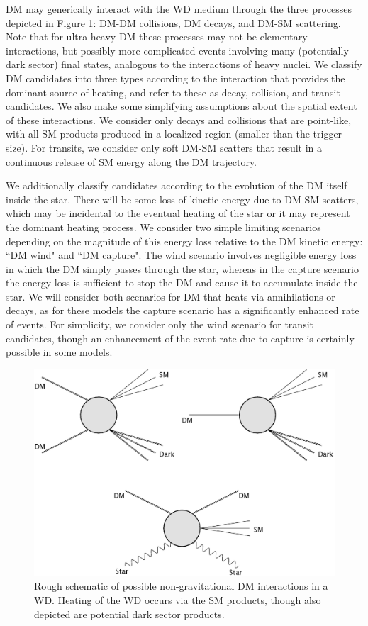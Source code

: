 \documentclass[preprintnumbers,amsmath,amssymb,prd, superscriptaddress,twocolumn]{revtex4}
\begin{document}
DM may generically interact with the WD medium through the three processes depicted in Figure \ref{fig:feynman}: DM-DM collisions, DM decays, and DM-SM scattering.
Note that for ultra-heavy DM these processes may not be elementary interactions, but possibly more complicated events involving many (potentially dark sector) final states, analogous to the interactions of heavy nuclei.
We classify DM candidates into three types according to the interaction that provides the dominant source of heating, and refer to these as decay, collision, and transit candidates.
We also make some simplifying assumptions about the spatial extent of these interactions.
We consider only decays and collisions that are point-like, with all SM products produced in a localized region (smaller than the trigger size).
For transits, we consider only soft DM-SM scatters that result in a continuous release of SM energy along the DM trajectory.

We additionally classify candidates according to the evolution of the DM itself inside the star.
There will be some loss of kinetic energy due to DM-SM scatters, which may be incidental to the eventual heating of the star or it may represent the dominant heating process.
We consider two simple limiting scenarios depending on the magnitude of this energy loss relative to the DM kinetic energy: ``DM wind" and ``DM capture".
The wind scenario involves negligible energy loss in which the DM simply passes through the star, whereas in the capture scenario the energy loss is sufficient to stop the DM and cause it to accumulate inside the star.
We will consider both scenarios for DM that heats via annihilations or decays, as for these models the capture scenario has a significantly enhanced rate of events.
For simplicity, we consider only the wind scenario for transit candidates, though an enhancement of the event rate due to capture is certainly possible in some models.

\begin{figure}
\includegraphics[scale=0.09]{feynmandiag.jpg}
\caption{Rough schematic of possible non-gravitational DM interactions in a WD. Heating of the WD occurs via the SM products, though also depicted are potential dark sector products.}
\label{fig:feynman}
\end{figure}
\end{document}
